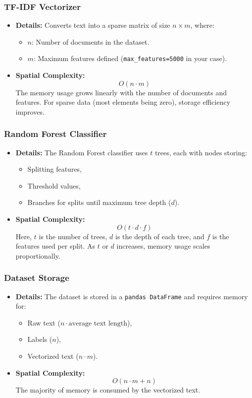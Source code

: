 \documentclass[runningheads,a4paper,11pt]{report}
\begin{document}
\subsubsection{TF-IDF Vectorizer}
\label{section:tf-idf}
\begin{itemize}
  \item \textbf{Details:} Converts text into a sparse matrix of size $n \times m$, where:
  \begin{itemize}
    \item $n$: Number of documents in the dataset.
    \item $m$: Maximum features defined (\texttt{max\_features=5000} in your case).
  \end{itemize}
  \item \textbf{Spatial Complexity:}
  \[
  O(n \cdot m)
  \]
  The memory usage grows linearly with the number of documents and features. For sparse data (most elements being zero), storage efficiency improves.
\end{itemize}

\subsubsection{Random Forest Classifier}
\label{section:random-classifier}
\begin{itemize}
  \item \textbf{Details:} The Random Forest classifier uses $t$ trees, each with nodes storing:
  \begin{itemize}
    \item Splitting features,
    \item Threshold values,
    \item Branches for splits until maximum tree depth ($d$).
  \end{itemize}
  \item \textbf{Spatial Complexity:}
  \[
  O(t \cdot d \cdot f)
  \]
  Here, $t$ is the number of trees, $d$ is the depth of each tree, and $f$ is the features used per split. As $t$ or $d$ increases, memory usage scales proportionally.
\end{itemize}

\subsubsection{Dataset Storage}
\label{section:data-storage}
\begin{itemize}
  \item \textbf{Details:} The dataset is stored in a \texttt{pandas DataFrame} and requires memory for:
  \begin{itemize}
    \item Raw text ($n \cdot \text{average text length}$),
    \item Labels ($n$),
    \item Vectorized text ($n \cdot m$).
  \end{itemize}
  \item \textbf{Spatial Complexity:}
  \[
  O(n \cdot m + n)
  \]
  The majority of memory is consumed by the vectorized text.
\end{itemize}
\end{document}
